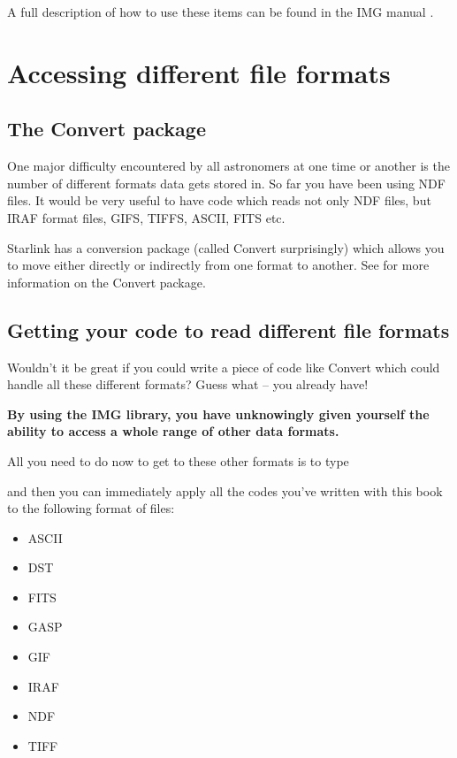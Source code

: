 \documentclass[11pt,nolof]{starlink}
\begin{document}
A full description of how to use these items can be found in the IMG manual
.

\section{Accessing different file formats}

\subsection{The Convert package}

One major difficulty encountered by all astronomers at one time or another is
the number of different formats data gets stored in. So far you have been
using NDF files. It would be very useful to have code which reads not
only NDF files, but IRAF format files, GIFS, TIFFS, ASCII, FITS etc.

Starlink has a conversion package (called Convert surprisingly) which
allows you to move either directly or indirectly from one format to another.
See  for more information on the Convert
package.

\subsection{Getting your code to read different file formats}

Wouldn't it be great if you could write a piece of code like Convert
which could handle all these different formats? Guess what -- you already
have!

\textbf{By using the IMG library, you have unknowingly given yourself the
ability to access a whole range of other data formats.}

\noindent
All you need to do now to get to these other formats is to type

\begin{terminalv}
\end{terminalv}

and then you can immediately apply all the codes you've written with this
book to the following format of files:

\begin{itemize}
\item ASCII
\item DST
\item FITS
\item GASP
\item GIF
\item IRAF
\item NDF
\item TIFF
\end{itemize}
\end{document}
